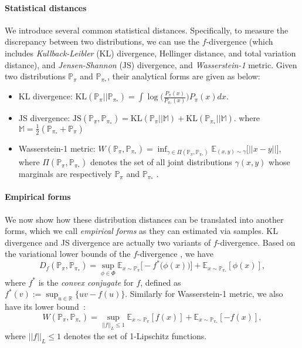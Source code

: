 \paragraph{Statistical distances} 
We introduce several common statistical distances. Specifically, to measure the discrepancy between two distributions, we can use the $f$-divergence (which includes \textit{Kullback-Leibler} (KL) divergence, Hellinger distance, and total variation distance), and \textit{Jensen-Shannon} (JS) divergence, and \textit{Wasserstein-1} metric. Given two distributions $\mathbb{P}_\pi$ and $\mathbb{P}_{\pi_*}$, their analytical forms are given as below:
\begin{itemize}
    \item KL divergence: 
    $\text{KL}(\mathbb{P}_\pi || \mathbb{P}_{\pi_*}) = \int \log\Big( \frac{P_\pi(x)}{P_{\pi_*}(x)} \Big) P_{\pi}(x) dx$.
    
    \item JS divergence:
    $\text{JS}(\mathbb{P}_{\pi}, \mathbb{P}_{\pi_*}) = \text{KL}(\mathbb{P}_\pi || \mathbb{M}) + \text{KL}(\mathbb{P}_{\pi_*} || \mathbb{M})$.  where $\mathbb{M} = \frac{1}{2}(\mathbb{P}_{\pi_*} +\mathbb{P}_{\pi})$ 
    
    \item Wasserstein-1 metric:
    $W(\mathbb{P}_{\pi}, \mathbb{P}_{\pi_*}) = \inf_{\gamma\in\Pi(\mathbb{P}_{\pi}, \mathbb{P}_{\pi_*})} \mathbb{E}_{(x, y)\sim\gamma}\big[ ||x-y|| \big]$, 
    where $\Pi(\mathbb{P}_{\pi}, \mathbb{P}_{\pi_*})$ denotes the set of all joint distributions $\gamma(x, y)$ whose marginals are respectively $\mathbb{P}_{\pi}$ and $\mathbb{P}_{\pi_*}$ .
\end{itemize}

\paragraph{Empirical forms} We now show how these distribution distances can be translated into another forms, which we call \textit{empirical forms} as they can estimated via samples. KL divergence and JS divergence are actually two variants of $f$-divergence. Based on the variational lower bounds of the $f$-divergence \citep{nguyen2010estimating}, we have
\begin{equation*}
D_{f} (\mathbb{P}_{\pi}, \mathbb{P}_{\pi_*}) = \sup_{\phi\in \Phi} \mathbb{E}_{x\sim\mathbb{P}_\pi}\big[-f^*\big(\phi(x)\big) \big] + \mathbb{E}_{x\sim\mathbb{P}_{\pi_*}}[\phi(x)],
\end{equation*}
where $f^*$ is the \textit{convex conjugate} for $f$, defined as $f^*(v) := \sup_{u\in\mathbb{R}} \{ uv - f(u) \}$. Similarly for Wasserstein-1 metric, we also have its lower bound~\citep{villani2008optimal}:
\begin{equation*}
W(\mathbb{P}_{\pi}, \mathbb{P}_{\pi_*}) = \sup_{||f||_{L}\leq 1} \mathbb{E}_{x\sim\mathbb{P}_\pi}[f(x)] + \mathbb{E}_{x\sim\mathbb{P}_{\pi_*}}[-f(x)], 
\end{equation*}
where $||f||_{L}\leq 1$ denotes the set of 1-Lipschitz functions.  

